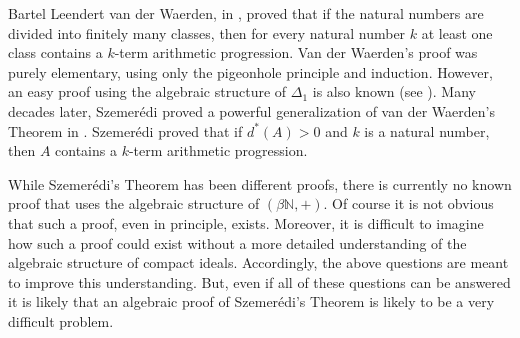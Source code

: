\documentclass[12pt]{article}
\theoremstyle{plain}
\theoremstyle{definition}
\newcommand{\bbN}{\mathbb{N}}
\begin{document}
Bartel Leendert van der Waerden, in \cite{Van-der-Waerden:1927fk},
proved that if the natural numbers are divided into finitely many
classes, then for every natural number $k$ at least one class contains
a $k$-term arithmetic progression.
Van der Waerden's proof was purely elementary, using only the
pigeonhole principle and induction. 
However, an easy proof using the algebraic structure of $\Delta_1$ is
also known (see \cite[Theorem 14.1 and Corollary 14.2]{Hindman:1998fk}).
Many decades later, Szemer\'{e}di proved a powerful generalization of van
der Waerden's Theorem in \cite{Szemeredi:1975uq}.
Szemer\'{e}di proved that if $d^*(A) > 0$ and $k$ is a natural number,
then $A$ contains a $k$-term arithmetic progression.

While Szemer\'{e}di's Theorem has been different proofs, there is
currently no known proof that uses the algebraic structure of
$(\beta\bbN,+)$. 
Of course it is not obvious that such a proof, even in principle,
exists.
Moreover, it is difficult to imagine how such a proof could exist
without a more detailed understanding of the algebraic structure of
compact ideals. 
Accordingly, the above questions are meant to improve this understanding.
But, even if all of these questions can be answered it is likely that
an algebraic proof of Szemer\'{e}di's Theorem is likely to be a
very difficult problem. 
\end{document}
